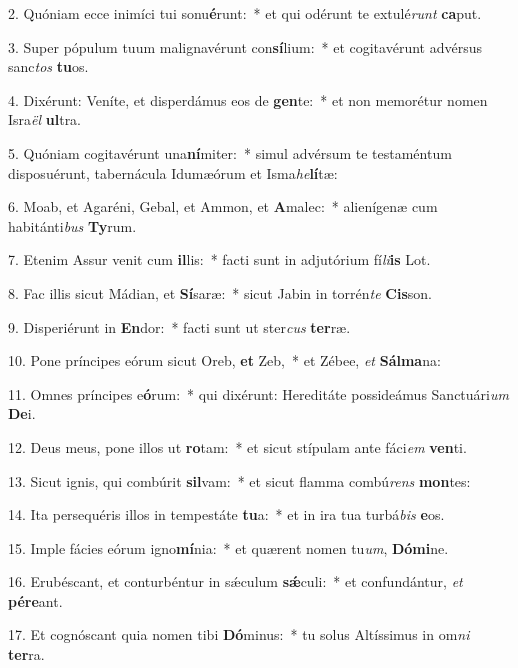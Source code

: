 2. Quóniam ecce inimíci tui sonu\textbf{é}runt:~*  et qui odérunt te extulé\textit{runt} \textbf{ca}put.\

3. Super pópulum tuum malignavérunt con\textbf{sí}lium:~*  et cogitavérunt advérsus sanc\textit{tos} \textbf{tu}os.\

4. Dixérunt: Veníte, et disperdámus eos de \textbf{gen}te:~*  et non memorétur nomen Isra\textit{ël} \textbf{ul}tra.\

5. Quóniam cogitavérunt una\textbf{ní}miter:~*  simul advérsum te testaméntum disposuérunt, tabernácula Idumæórum et Isma\textit{he}\textbf{lí}tæ:\

6. Moab, et Agaréni, Gebal, et Ammon, et \textbf{A}malec:~*  alienígenæ cum habitánti\textit{bus} \textbf{Ty}rum.\

7. Etenim Assur venit cum \textbf{il}lis:~*  facti sunt in adjutórium fí\textit{li}\textbf{is} Lot.\

8. Fac illis sicut Mádian, et \textbf{Sí}saræ:~*  sicut Jabin in torrén\textit{te} \textbf{Cis}son.\

9. Disperiérunt in \textbf{En}dor:~*  facti sunt ut ster\textit{cus} \textbf{ter}ræ.\

10. Pone príncipes eórum sicut Oreb, \textbf{et} Zeb,~*  et Zébee, \textit{et} \textbf{Sál}\textbf{ma}na:\

11. Omnes príncipes e\textbf{ó}rum:~*  qui dixérunt: Hereditáte possideámus Sanctuári\textit{um} \textbf{De}i.\

12. Deus meus, pone illos ut \textbf{ro}tam:~*  et sicut stípulam ante fáci\textit{em} \textbf{ven}ti.\

13. Sicut ignis, qui combúrit \textbf{sil}vam:~*  et sicut flamma combú\textit{rens} \textbf{mon}tes:\

14. Ita persequéris illos in tempestáte \textbf{tu}a:~*  et in ira tua turbá\textit{bis} \textbf{e}os.\

15. Imple fácies eórum igno\textbf{mí}nia:~*  et quærent nomen tu\textit{um}, \textbf{Dó}\textbf{mi}ne.\

16. Erubéscant, et conturbéntur in sǽculum \textbf{sǽ}culi:~*  et confundántur, \textit{et} \textbf{pér}\textbf{e}ant.\

17. Et cognóscant quia nomen tibi \textbf{Dó}minus:~*  tu solus Altíssimus in om\textit{ni} \textbf{ter}ra.\

